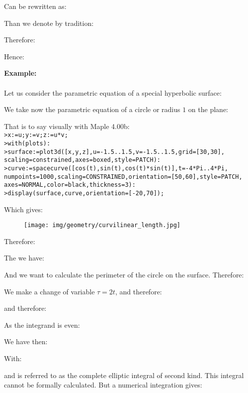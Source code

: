 	Can be rewritten as:
	
	Than we denote by tradition:
	
	Therefore:
	
	Hence:
	
	
	\pagebreak
	\begin{tcolorbox}[colframe=black,colback=white,sharp corners]
	\textbf{{\Large {}}Example:}\\\\
	Let us consider the parametric equation of a special hyperbolic surface:
	
	We take now the parametric equation of a circle or radius $1$ on the plane:
	
	That is to say visually with Maple 4.00b:\\
	
	\texttt{>x:=u;y:=v;z:=u*v;\\
	>with(plots):\\
	>surface:=plot3d([x,y,z],u=-1.5..1.5,v=-1.5..1.5,grid=[30,30],\\
	scaling=constrained,axes=boxed,style=PATCH):\\
	>curve:=spacecurve([cos(t),sin(t),cos(t)*sin(t)],t=-4*Pi..4*Pi,\\
	numpoints=1000,scaling=CONSTRAINED,orientation=[50,60],style=PATCH,\\
	axes=NORMAL,color=black,thickness=3):\\
	>display(surface,curve,orientation=[-20,70]);
	}
	
	Which gives:
	\begin{figure}[H]
		\centering
		\texttt{[image: img/geometry/curvilinear\_length.jpg]}
	\end{figure}
	\end{tcolorbox}
	
	\begin{tcolorbox}[colframe=black,colback=white,sharp corners]
	Therefore:
	
	The we have:
	
	And we want to calculate the perimeter of the circle on the surface. Therefore:
	
	We make a change of variable $\tau=2t$, and therefore:
	
	and therefore:
	
	\end{tcolorbox}
	
	\begin{tcolorbox}[colframe=black,colback=white,sharp corners]
	As the integrand is even:
	
	We have then:
		
	With:
	
	and is referred to as the complete elliptic integral of second kind. 	This integral cannot be formally calculated. But a numerical integration gives:
	
	\end{tcolorbox}
	
